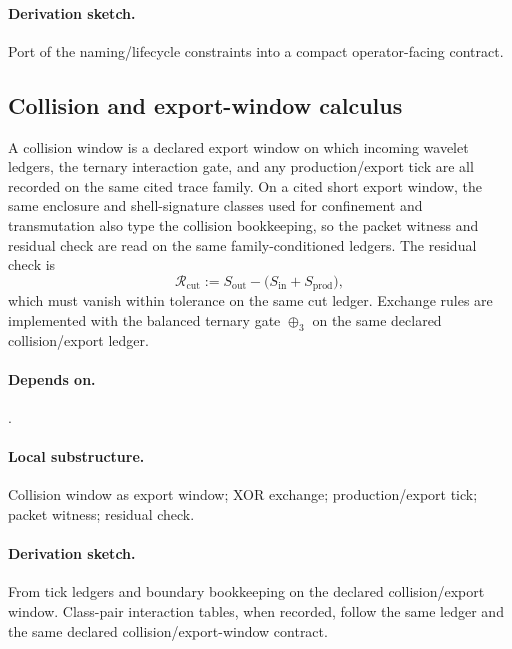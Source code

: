 \paragraph{Derivation sketch.} Port of the naming/lifecycle constraints into a compact operator-facing contract.

\subsection{Collision and export-window calculus}\label{subsec:collision-export-calculus}
\begin{definition}
\label{def:collision-export-operator}
A collision window is a declared export window on which incoming wavelet ledgers, the ternary interaction gate, and any production/export tick are all recorded on the same cited trace family. On a cited short export window, the same enclosure and shell-signature classes used for confinement and transmutation also type the collision bookkeeping, so the packet witness and residual check are read on the same family-conditioned ledgers. The residual check is
\[
\mathcal R_{\mathrm{cut}}:=S_{\mathrm{out}}-\bigl(S_{\mathrm{in}}+S_{\mathrm{prod}}\bigr),
\]
which must vanish within tolerance on the same cut ledger. Exchange rules are implemented with the balanced ternary gate $\oplus_3$ on the same declared collision/export ledger.
\end{definition}

\paragraph{Depends on.} .
\paragraph{Local substructure.} Collision window as export window; XOR exchange; production/export tick; packet witness; residual check.
\paragraph{Derivation sketch.} From tick ledgers and boundary bookkeeping on the declared collision/export window. Class-pair interaction tables, when recorded, follow the same ledger and the same declared collision/export-window contract.
